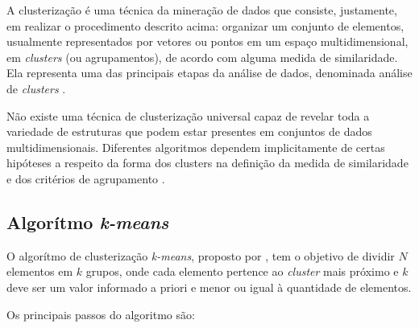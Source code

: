 A clusterização é uma técnica da mineração de dados que consiste, justamente, em realizar o procedimento descrito acima: organizar um conjunto de elementos, usualmente representados por vetores ou pontos em um espaço multidimensional, em \textit{clusters} (ou agrupamentos), de acordo com alguma medida de similaridade. Ela representa uma das principais etapas da análise de dados, denominada análise de \textit{clusters} \cite{jain1999}.

Não existe uma técnica de clusterização universal capaz de revelar toda a variedade de estruturas que podem estar presentes em conjuntos de dados multidimensionais. Diferentes algoritmos dependem implicitamente de certas hipóteses a respeito da forma dos clusters na definição da medida de similaridade e dos critérios de agrupamento \cite{estivill2002}.

\subsection{Algorítmo \textit{k-means}}
\label{sub:k_means}

O algorítmo de clusterização \textit{k-means}, proposto por , tem o objetivo de dividir \(N\) elementos em \(k\) grupos, onde cada elemento pertence ao \textit{cluster} mais próximo e \(k\) deve ser um valor informado a priori e menor ou igual à quantidade de elementos.

Os principais passos do algoritmo são:

